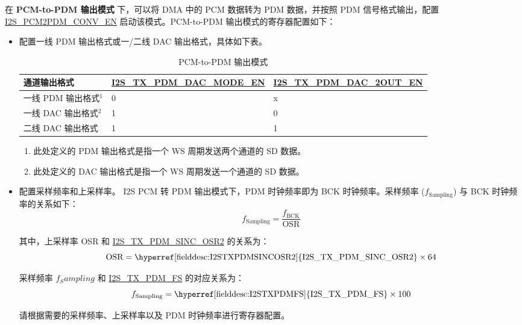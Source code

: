 \documentclass[main\_\_CN.tex]{subfiles}
\begin{document}
在 \textbf{PCM-to-PDM 输出模式} 下，可以将 DMA 中的 PCM 数据转为 PDM 数据，并按照 PDM 信号格式输出，配置 \hyperref[fielddesc:I2SPCM2PDMCONVEN]{I2S\_PCM2PDM\_CONV\_EN} 启动该模式。PCM-to-PDM 输出模式的寄存器配置如下：
\begin{itemize}
    \item 配置一线 PDM 输出格式或一/二线 DAC 输出格式，具体如下表。
\begin{table}[H]
    \centering
    \caption{PCM-to-PDM 输出模式}
    \label{tab:i2s-pcm-pdm-output-mode}
    \begin{tabular}{|p{4.3cm}|R{5.0cm}|R{4.8cm}|}
    \hline
    \textbf{通道输出格式}&\textbf{\hyperref[fielddesc:I2STXPDMDACMODEEN]{I2S\_TX\_PDM\_DAC\_MODE\_EN}} & \textbf{\hyperref[fielddesc:I2STXPDMDAC2OUTEN]{I2S\_TX\_PDM\_DAC\_2OUT\_EN}}\\ \hline
    一线 PDM 输出格式\hyperref[note-1]{$^1$}& 0 & x \\ \hline
    一线 DAC 输出格式\hyperref[note-2]{$^2$} &1   & 0  \\ \hline 
    二线 DAC 输出格式 & 1 & 1 \\ \hline
    \end{tabular}
\end{table} 
\begin{tiplisting}
\vspace{-2em}
\begin{enumerate}
    \item \label{note-1} 此处定义的 PDM 输出格式是指一个 WS 周期发送两个通道的 SD 数据。
    \item \label{note-2} 此处定义的 DAC 输出格式是指一个 WS 周期发送一个通道的 SD 数据。
\end{enumerate}
\end{tiplisting}
\vspace{-1em}

    \item 配置采样频率和上采样率。\newline
    \chipname{} I2S PCM 转 PDM 输出模式下，PDM 时钟频率即为 BCK 时钟频率。采样频率 ($f_{\textrm{Sampling}}$) 与 BCK 时钟频率的关系如下：
    $$f_{\textrm{Sampling}} = \frac{f_{\textrm{BCK}}}{\textrm{OSR}}$$
    
    其中，上采样率 OSR 和 \hyperref[fielddesc:I2STXPDMSINCOSR2]{I2S\_TX\_PDM\_SINC\_OSR2} 的关系为：
    $${\textrm{OSR}} = {\textrm{\hyperref[fielddesc:I2STXPDMSINCOSR2]{I2S\_TX\_PDM\_SINC\_OSR2}}} \times {\textrm{64}}$$
    
    采样频率 $f_Sampling$ 和 \hyperref[fielddesc:I2STXPDMFS]{I2S\_TX\_PDM\_FS} 的对应关系为：
    $$f_{\textrm{Sampling}} = {\textrm{\hyperref[fielddesc:I2STXPDMFS]{I2S\_TX\_PDM\_FS}}} \times {\textrm{100}}$$
    
    请根据需要的采样频率、上采样率以及 PDM 时钟频率进行寄存器配置。
\end{itemize}
\end{document}
